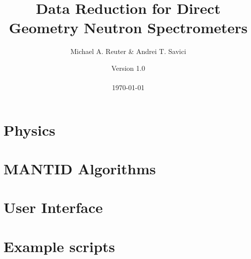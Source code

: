 \documentclass[11pt]{article}
\numberwithin{equation}{section}
\numberwithin{figure}{section}
\begin{document}
\title{Data Reduction for Direct Geometry Neutron Spectrometers}
\author{Michael A. Reuter \& Andrei T. Savici}
\date{Version 1.0 \\ \ \\ \today}
\maketitle

\section{Physics}\label{sec:Physics}

\section{MANTID Algorithms}\label{sec:Algs}

\section{User Interface}\label{sec:UI}

\section{Example scripts}\label{sec:Examples}

\end{document}
